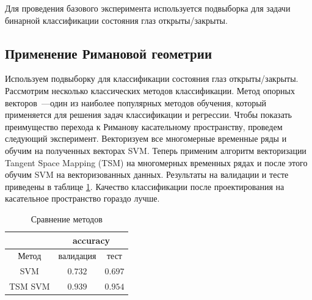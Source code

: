 \documentclass[a4paper, 12pt]{extarticle}
\begin{document}
Для проведения базового эксперимента используется подвыборка для задачи бинарной классификации состояния глаз открыты/закрыты.

\subsection*{Применение Римановой геометрии}
Используем подвыборку для классификации состояния глаз открыты/закрыты.
Рассмотрим несколько классических методов классификации. 
Метод опорных векторов~---один из наиболее популярных методов обучения, который применяется для решения задач классификации и регрессии.
Чтобы показать преимущество перехода к Риманову касательному пространству, проведем следующий эксперимент. 
Векторизуем все многомерные временные ряды и обучим на полученных векторах SVM. 
Теперь применим алгоритм векторизации Tangent Space Mapping (TSM) на многомерных временных рядах и после этого обучим SVM на векторизованных данных. 
Результаты на валидации и тесте приведены в таблице \ref{table:Riman}. 
Качество классификации после проектирования на касательное пространство гораздо лучше.

\begin{table}[h!]
	\centering
	\caption{Сравнение методов}
	\begin{tabular}{|c|c|c|}
		\hline
		& \multicolumn{2}{|c|}{accuracy}  \\ \hline 
		Метод & валидация  & тест \\ \hline \hline
		SVM    & $0.732$ & $0.697$      \\ \hline
		TSM SVM    & $0.939$ & $0.954$		\\ \hline
	\end{tabular}
	\label{table:Riman}
\end{table}
\end{document}
